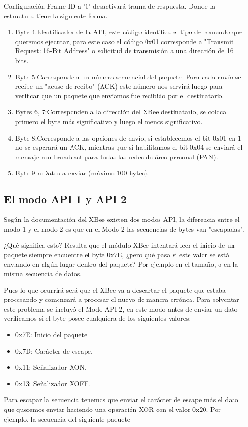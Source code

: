\documentclass[11pt,oneside,spanish,a4paper]{article}
\begin{document}
Configuración Frame ID a '0' desactivará trama de respuesta.
Donde la estructura tiene la siguiente forma:
\begin{enumerate}
	\item Byte 4:Identificador de la API, este código identifica el tipo de comando que queremos ejecutar, para este caso el código 0x01 corresponde a "Transmit Request: 16-Bit Address" o solicitud de transmisión a una dirección de 16 bits.
	\item Byte 5:Corresponde a un número secuencial del paquete. Para cada envío se recibe un "acuse de recibo" (ACK) este número nos servirá luego para verificar que un paquete que enviamos fue recibido por el destinatario.
	\item Bytes 6, 7:Corresponden a la dirección del XBee destinatario, se coloca primero el byte más significativo y luego el menos significativo.
	\item Byte 8:Corresponde a las opciones de envío, si establecemos el bit 0x01 en 1 no se esperará un ACK, mientras que si habilitamos el bit 0x04 se enviará el mensaje con broadcast para todas las redes de área personal (PAN).
	\item Byte 9-n:Datos a enviar (máximo 100 bytes).
\end{enumerate}
\subsection{El modo API 1 y API 2}
Según la documentación del XBee existen dos modos API, la diferencia entre el modo 1 y el modo 2 es que en el Modo 2 las secuencias de bytes van "escapadas".

¿Qué significa esto? Resulta que el módulo XBee intentará leer el inicio de un paquete siempre encuentre el byte 0x7E, ¿pero qué pasa si este valor se está enviando en algún lugar dentro del paquete? Por ejemplo en el tamaño, o en la misma secuencia de datos.

Pues lo que ocurrirá será que el XBee va a descartar el paquete que estaba procesando y comenzará a procesar el nuevo de manera errónea. Para solventar este problema se incluyó el Modo API 2, en este modo antes de enviar un dato verificamos si el byte posee cualquiera de los siguientes valores:
\begin{itemize}
	\item 0x7E: Inicio del paquete.
	\item 0x7D: Carácter de escape.
	\item 0x11: Señalizador XON.
	\item 0x13: Señalizador XOFF.	
\end{itemize}
Para escapar la secuencia tenemos que enviar el carácter de escape más el dato que queremos enviar haciendo una operación XOR con el valor 0x20.
Por ejemplo, la secuencia del siguiente paquete:
\end{document}
